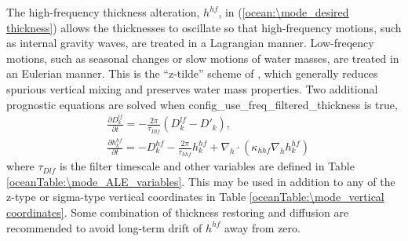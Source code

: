 The high-frequency thickness alteration, $h^{hf}$, in (\ref{ocean:\mode_desired thickness}) allows the thicknesses to oscillate so that high-frequency motions, such as internal gravity waves, are treated in a Lagrangian manner.  Low-freqency motions, such as seasonal changes or slow motions of water masses, are treated in an Eulerian manner.  This is the ``z-tilde'' scheme of \citet{Leclair_Madec11om}, which generally reduces spurious vertical mixing and preserves water mass properties.  Two additional prognostic equations are solved when config\_use\_freq\_filtered\_thickness is true,
\begin{eqnarray}
\label{ocean:\mode_Dlf}
 & \displaystyle
  \frac{\partial D^{lf}_k}{\partial t} = - \frac{2\pi}{\tau_{Dlf}} \left( D^{lf}_k - D'_k \right), 
\\ & \displaystyle
\label{ocean:\mode_hhf}
\frac{\partial h^{hf}_k}{\partial t} =  - D^{hf}_k - \frac{2\pi}{\tau_{hhf}} h^{hf}_k + \nabla_h\cdot \left( \kappa_{hhf} \nabla_h h^{hf}_k \right) 
\end{eqnarray}
where $\tau_{Dlf}$ is the filter timescale and other variables are defined in Table \ref{oceanTable:\mode_ALE_variables}.  This may be used in addition to any of the z-type or sigma-type vertical coordinates in Table \ref{oceanTable:\mode_vertical coordinates}.  Some combination of thickness restoring and diffusion are recommended to avoid long-term drift of $h^{hf}$ away from zero.



